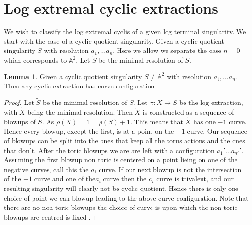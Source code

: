 \documentclass[11pt]{report}
\theoremstyle{definition}
\theoremstyle{definition}
\theoremstyle{definition}
\theoremstyle{definition}
\theoremstyle{definition}
\newtheorem{lem}[thm]{Lemma}
\theoremstyle{definition}
\theoremstyle{definition}
\theoremstyle{definition}
\begin{document}
 


\section{Log extremal cyclic extractions}

We wish to classify the log extremal cyclis of a given log terminal singularity. We start with the case of a cyclic quotient singularity. Given a cyclic quotient singularity $S$ with resolution $a_1, \dots a_n$. Here we allow we separate the case $n=0$ which corresponds to $\mathbb{A}^2$. Let $\widetilde{S}$ be the minimal resolution of $S$.

\begin{lem}
Given a cyclic quotient singularity $S \neq \mathbb{A}^2$ with resolution $a_1, \dots a_n$. Then any cyclic extraction has curve configuration 

\end{lem}

\begin{proof}
Let $\widetilde{S}$ be the minimal resolution of $S$. Let $\pi : X \rightarrow S$ be the log extraction, with $\widetilde{X}$ being the minimal resolution. Then $\widetilde{X}$ is constructed as a sequence of blowups of $\widetilde{S}$. As $\rho(X) = 1 = \rho(S) + 1$. This means that $\widetilde{X}$ has one $-1$ curve. Hence every blowup, except the first, is at a point on the $-1$ curve. Our sequence of blowups can be split into the ones that keep all the torus actions and the ones that don't. After the toric blowups we are are left with a configuration $a_1' \dots a_{n'}'$. Assuming the first blowup non toric is centered on a point  lieing on one of the negative curves, call this the $a_i$ curve. If our next blowup is not the intersection of the $-1$ curve and one of the$a_i$ curve then the $a_i$ curve is trivalent, and our resulting singularity will clearly not be cyclic quotient. Hence there is only one choice of point we can blowup leading to the above curve configuration. Note that there are no non toric blowups the choice of curve is  upon which the non toric blowups are centred is fixed .
\end{proof}
\end{document}
